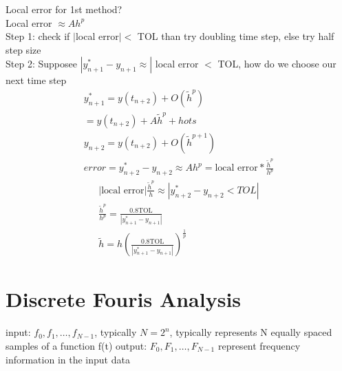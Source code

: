 \documentclass[10pt,usletter]{article}
\begin{document}
Local error for 1st method?\\
Local error $\approx Ah^p$\\
Step 1: check if $|$local error$| <$ TOL than try doubling time step, else try half step size\\
Step 2: Supposee $|y_{n+1}^*-y_{n+1}\approx|$ local error $<$ TOL, how do we choose our next time step\\
\begin{align*}
y_{n+1}^*=y(t_{n+2})+O(\tilde h^p)\\
=y(t_{n+2})+A\tilde h^p+hots\\
y_{n+2}=y(t_{n+2})+O(\tilde h^{p+1})\\
error = y_{n+2}^*-y_{n+2}\approx A h^p=\text{local error} * \frac{\tilde h^p}{h^p}
\end{align*} 
\begin{align*}
|\text{local error}|\frac{\tilde{h}^p}{h}\approx |y_{n+2}^*-y_{n+2}<TOL|\\
\frac{\tilde{h}^p}{h^p}=\frac{0.8\text{TOL}}{|y_{n+1}^*-y_{n+1}|}\\
\tilde{h}=h(\frac{0.8\text{TOL}}{|y_{n+1}^*-y_{n+1}|})^{\frac{1}{p}}
\end{align*}

\section{Discrete Fouris Analysis}
input: $f_0,f_1,\hdots, f_{N-1}$, typically $N=2^n$, typically represents N equally spaced samples of a function f(t)
output: $F_0,F_1,\hdots,F_{N-1}$ represent frequency information in the input data
\end{document}
